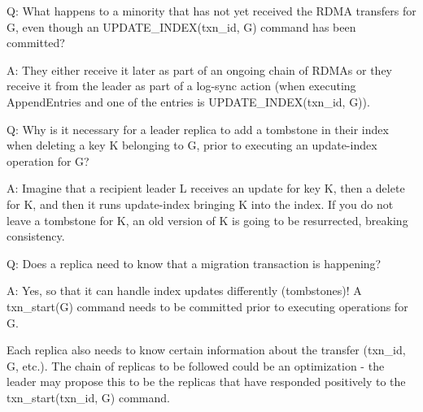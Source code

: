 Q: What happens to a minority that has not yet received the RDMA transfers for G, even though an UPDATE\_INDEX(txn\_id, G) command has been committed?

A: They either receive it later as part of an ongoing chain of RDMAs or they receive it from the leader as part of a log-sync action (when executing AppendEntries and one of the entries is UPDATE\_INDEX(txn\_id, G)).

Q: Why is it necessary for a leader replica to add a tombstone in their index when deleting a key K belonging to G, prior to executing an update-index operation for G?

A: Imagine that a recipient leader L receives an update for key K, then a delete for K, and then it runs update-index bringing K into the index. If you do not leave a tombstone for K, an old version of K is going to be resurrected, breaking consistency.

Q: Does a replica need to know that a migration transaction is happening?

A: Yes, so that it can handle index updates differently (tombstones)! A txn\_start(G) command needs to be committed prior to executing operations for G.

Each replica also needs to know certain information about the transfer (txn\_id, G, etc.). The chain of replicas to be followed could be an optimization - the leader may propose this to be the replicas that have responded positively to the txn\_start(txn\_id, G) command.



